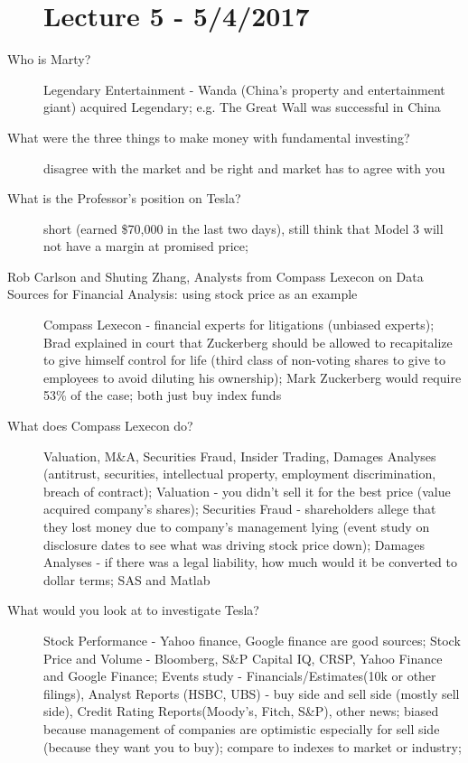 \documentclass[11pt]{article}
\begin{document}
\begin{description}
\section{Lecture 5 - 5/4/2017}
\item[Who is Marty?]
  Legendary Entertainment - Wanda (China's property and entertainment giant) acquired Legendary;
  e.g. The Great Wall was successful in China
\item[What were the three things to make money with fundamental investing?]
  disagree with the market and be right and market has to agree with you
\item[What is the Professor's position on Tesla?]
  short (earned \$70,000 in the last two days), still think that Model 3 will not have a margin at promised price;
\item[Rob Carlson and Shuting Zhang, Analysts from Compass Lexecon on Data Sources for Financial Analysis: using stock price as an example]
  Compass Lexecon - financial experts for litigations (unbiased experts);
  Brad explained in court that Zuckerberg should be allowed to recapitalize to give himself control for life (third class of non-voting shares to give to employees to avoid diluting his ownership);
  Mark Zuckerberg would require 53\% of the case;
  both just buy index funds
\item[What does Compass Lexecon do?]
  Valuation, M\&A, Securities Fraud, Insider Trading, Damages Analyses (antitrust, securities, intellectual property, employment discrimination, breach of contract);
  Valuation - you didn't sell it for the best price (value acquired company's shares);
  Securities Fraud - shareholders allege that they lost money due to company's management lying (event study on disclosure dates to see what was driving stock price down);
  Damages Analyses - if there was a legal liability, how much would it be converted to dollar terms;
  SAS and Matlab
\item[What would you look at to investigate Tesla?]
  Stock Performance - Yahoo finance, Google finance are good sources;
  Stock Price and Volume - Bloomberg, S\&P Capital IQ, CRSP, Yahoo Finance and Google Finance;
  Events study - Financials/Estimates(10k or other filings), Analyst Reports (HSBC, UBS) - buy side and sell side (mostly sell side),
  Credit Rating Reports(Moody's, Fitch, S\&P), other news;
  biased because management of companies are optimistic especially for sell side (because they want you to buy);
  compare to indexes to market or industry;

\end{description}
\end{document}
